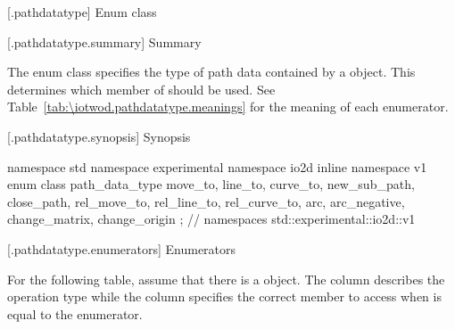  [\iotwod.pathdatatype] {Enum class }

 [\iotwod.pathdatatype.summary] { Summary}

\pnum
The  enum class specifies the type of path data contained 
by a  object. This determines which member of 
 should be used.
See Table~\ref{tab:\iotwod.pathdatatype.meanings} for the meaning of each
 enumerator.

 [\iotwod.pathdatatype.synopsis] { Synopsis}

\begin{codeblock}
namespace std { namespace experimental { namespace io2d { inline namespace v1 {
  enum class path_data_type {
    move_to,
    line_to,
    curve_to,
    new_sub_path,
    close_path,
    rel_move_to,
    rel_line_to,
    rel_curve_to,
    arc,
    arc_negative,
    change_matrix,
    change_origin
  };
} } } } // namespaces std::experimental::io2d::v1
\end{codeblock}

 [\iotwod.pathdatatype.enumerators] { Enumerators}

\pnum
For the following table, assume that there is a  object. The 
 column describes the operation type while the  
column specifies the correct  member to access when 
 is equal to the enumerator.


